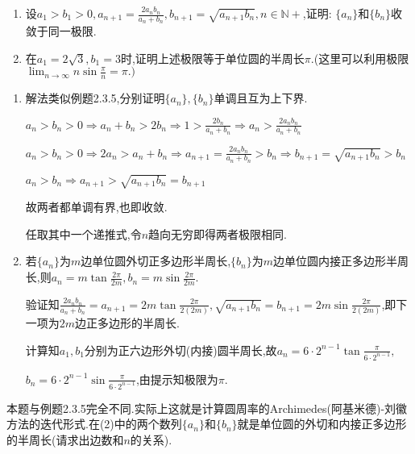      \begin{exercise}
         \begin{enumerate}
             \item 设$a_1>b_1>0,a_{n+1}=\frac{2a_nb_n}{a_n+b_n},b_{n+1}=\sqrt{a_{n+1}b_n},n\in \mathbb{N}+$,证明:
                   $\{a_n\}$和$\{b_n\}$收敛于同一极限.

             \item 在$a_1=2\sqrt{3},b_1=3$时,证明上述极限等于单位圆的半周长$\pi$.(这里可以利用极限$\lim_{n\to\infty}n\sin\frac{\pi}{n}=\pi.)$
         \end{enumerate}
     \end{exercise}

     \begin{solution}
         \begin{enumerate}
             \item 解法类似例题2.3.5,分别证明$\{a_n\},\{b_n\}$单调且互为上下界.

                   $a_n>b_n>0\Rightarrow a_n+b_n>2b_n\Rightarrow 1>\frac{2b_n}{a_n+b_n}\Rightarrow a_n>\frac{2a_nb_n}{a_n+b_n}$

                   $a_n>b_n>0\Rightarrow 2a_n>a_n+b_n\Rightarrow a_{n+1}=\frac{2a_nb_n}{a_n+b_n}>b_n\Rightarrow b_{n+1}=\sqrt{a_{n+1}b_n}>b_n$

                   $a_n>b_n\Rightarrow a_{n+1}>\sqrt{a_{n+1}b_n}=b_{n+1}$

                   故两者都单调有界,也即收敛.

                   任取其中一个递推式,令$n$趋向无穷即得两者极限相同.
             \item 若$\{a_n\}$为$m$边单位圆外切正多边形半周长,$\{b_n\}$为$m$边单位圆内接正多边形半周长,则$a_n=m\tan\frac{2\pi}{2m},b_n=m\sin\frac{2\pi}{2m}$.

                   验证知$\frac{2a_nb_n}{a_n+b_n}=a_{n+1}=2m\tan\frac{2\pi}{2(2m)},\sqrt{a_{n+1}b_n}=b_{n+1}=2m\sin\frac{2\pi}{2(2m)}$,即下一项为$2m$边正多边形的半周长.

                   计算知$a_1,b_1$分别为正六边形外切(内接)圆半周长,故$a_n=6\cdot2^{n-1}\tan\frac{\pi}{6\cdot2^{n-1}},$

                   $b_n=6\cdot2^{n-1}\sin\frac{\pi}{6\cdot2^{n-1}}$,由提示知极限为$\pi$.
         \end{enumerate}
     \end{solution}
     \begin{note}
         本题与例题2.3.5完全不同.实际上这就是计算圆周率的Archimedes(阿基米德)-刘徽方法的迭代形式.在(2)中的两个数列$\{a_n\}$和$\{b_n\}$就是单位圆的外切和内接正多边形的半周长(请求出边数和$n$的关系).
     \end{note}

